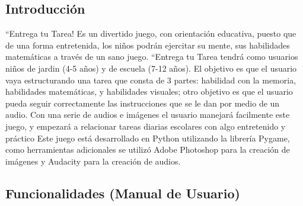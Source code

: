 \documentclass[12pt]{article}
\begin{document}
{{{\begin{flushleft}
\subsection{Introducci\'on}
\normalsize
``Entrega tu Tarea! Es un divertido juego, con orientación educativa, puesto que de una forma entretenida, los niños podrán ejercitar su mente, sus habilidades matemáticas a través de un sano juego.
\newline
\newline
``Entrega tu Tarea tendrá como usuarios niños de jardin (4-5 años)  y de escuela (7-12 años). El objetivo es que el usuario vaya estructurando una tarea que consta de 3 partes: habilidad con la memoria, habilidades matemáticas, y habilidades visuales; otro objetivo es que el usuario pueda seguir correctamente las instrucciones que se le dan por medio de un audio.
\newline
\newline
Con una serie de audios e imágenes el usuario manejará facilmente este juego, y empezará a relacionar tareas diarias escolares con algo entretenido y práctico
\newline
\newline
Este juego está desarrollado en Python utilizando la librería Pygame, como herramientas adicionales se utilizó Adobe Photoshop para la creación de imágenes y Audacity para la creación de audios.
\vspace{0.1in}

\subsection{Funcionalidades (Manual de Usuario)}


\end{flushleft}}}}
\end{document}
